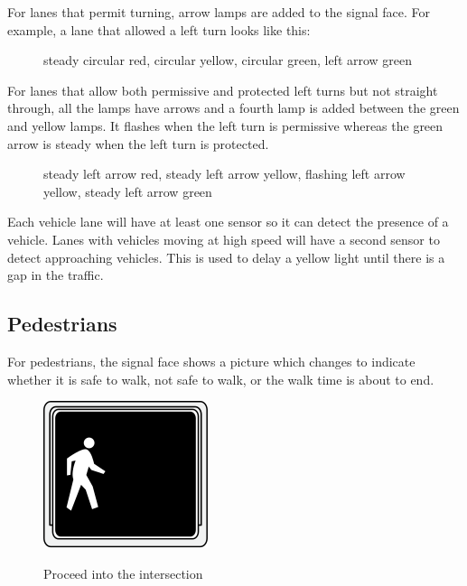 \documentclass[letterpaper,twoside]{article}
\begin{document}
For lanes that permit turning, arrow lamps are added to the signal face.
For example, a lane that allowed a left turn looks like this:

\begin{figure}[H]
           {\caption{steady circular red, circular yellow, circular green,
               left arrow green}\label{fig:four_A}}
\end{figure}

For lanes that allow both permissive and protected left turns but not
straight through, all the lamps have arrows and
a fourth lamp is added between the green and yellow lamps.  It flashes
when the left turn is permissive whereas the green arrow is steady
when the left turn is protected.

\begin{figure}[H]
           {\caption{steady left arrow red, steady left arrow yellow, flashing
               left arrow yellow, steady left arrow green}\label{four_B}}
\end{figure}

Each vehicle lane will have at least one sensor so it can detect the
presence of a vehicle.  Lanes with vehicles moving at high speed will
have a second sensor to detect approaching vehicles.  This is used to
delay a yellow light until there is a gap in the traffic.

\subsection{Pedestrians}
For pedestrians, the signal face shows a picture which changes to indicate
whether it is safe to walk, not safe to walk, or the walk time is about to end.

\begin{figure}[H]
  \fcapside
           {\includegraphics{MUTCD_Ped_Signal_-_Walk}}
           {\caption{Proceed into the intersection}}
\end{figure}
\end{document}

